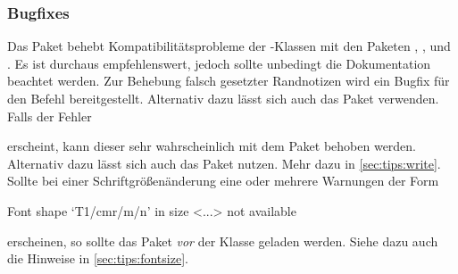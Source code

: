 \subsubsection{Bugfixes}
%
\begin{DeclarePackages}
  Das Paket behebt Kompatibilitätsprobleme der \KOMAScript-Klassen mit den 
  Paketen , ,  und
  . Es ist durchaus empfehlenswert, jedoch sollte unbedingt 
  die Dokumentation beachtet werden.
  Zur Behebung falsch gesetzter Randnotizen wird ein Bugfix für den Befehl 
   bereitgestellt. Alternativ dazu lässt sich auch das Paket 
   verwenden.
  Falls der Fehler 
  \vspace{-\baselineskip}
  erscheint, kann dieser sehr wahrscheinlich mit dem Paket  
  behoben werden. Alternativ dazu lässt sich auch das Paket 
   nutzen. Mehr dazu in \autoref{sec:tips:write}.
  Sollte bei einer Schriftgrößenänderung eine oder mehrere Warnungen der Form
  \begin{Code}
    Font shape `T1/cmr/m/n' in size <...> not available
  \end{Code}\vspace{-\baselineskip}%
  erscheinen, so sollte das Paket  \emph{vor} der Klasse 
  geladen werden. Siehe dazu auch die Hinweise in \autoref{sec:tips:fontsize}.
\end{DeclarePackages}
